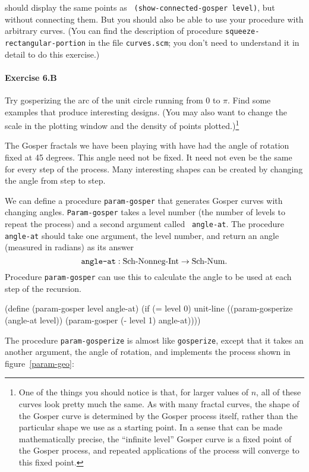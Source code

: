 \noindent should display the same points as {\tt
(show-connected-gosper level)}, but without connecting them.  But you
should also be able to use your procedure with arbitrary curves.  (You can
find the description of procedure {\tt squeeze-rectangular-portion} in the
file {\tt curves.scm}; you don't need to understand it in detail to do
this exercise.)

\paragraph{Exercise 6.B}
Try gosperizing the arc of the unit circle running from 0 to $\pi$.  Find
some examples that produce interesting designs.  (You may also want to
change the scale in the plotting window and the density of points
plotted.)\footnote{One of the things you should notice is that, for larger
values of $n$, all of these curves look pretty much the same.  As with
many fractal curves, the shape of the Gosper curve is determined by the
Gosper process itself, rather than the particular shape we use as a
starting point.  In a sense that can be made mathematically precise, the
``infinite level'' Gosper curve is a fixed point of the Gosper process,
and repeated applications of the process will converge to this fixed
point.}

\medskip

The Gosper fractals we have been playing with have had the angle of
rotation fixed at 45 degrees. This angle need not be fixed.  It need not
even be the same for every step of the process.  Many interesting shapes
can be created by changing the angle from step to step.

We can define a procedure {\tt param-gosper} that generates Gosper curves
with changing angles.  {\tt Param-gosper} takes a level number (the number
of levels to repeat the process) and a second argument called {\tt
angle-at}. The procedure {\tt angle-at} should take one argument, the level
number, and return an angle (measured in radians) as its answer
\[\hbox{\tt angle-at} : \mbox{Sch-Nonneg-Int} \rightarrow \mbox{Sch-\-Num}.\]
Procedure {\tt param-gosper} can use this to calculate the angle to be
used at each step of the recursion.

\beginlisp
(define (param-gosper level angle-at)
  (if (= level 0)
      unit-line
      ((param-gosperize (angle-at level))
       (param-gosper (- level 1) angle-at))))
\endlisp


The procedure {\tt param-gosperize} is almost like {\tt gosperize}, except
that it takes an another argument, the angle of rotation, and implements
the process shown in figure~\ref{param-geo}:
        
